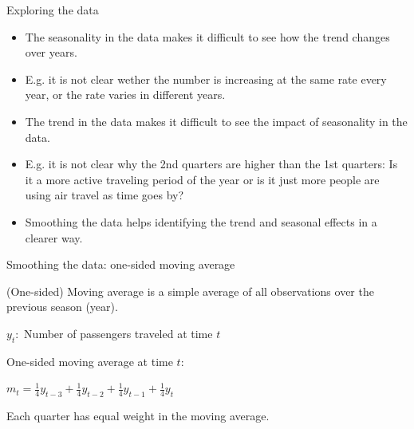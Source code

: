 \documentclass{beamer}\usepackage[]{graphicx}\usepackage[]{color}
\begin{document}
\begin{darkframes}
\begin{frame}[fragile]{Exploring the data}
\begin{itemize}[<+->]
        \item The seasonality in the data makes it difficult to see how the trend changes over years.
        
        \item E.g. it is not clear wether the number is increasing at the same rate every year, or the rate varies in different years. 
        
        \item The trend in the data makes it difficult to see the impact of seasonality in the data. 
        
        \item E.g. it is not clear why the 2nd quarters are higher than the 1st quarters: Is it a more active traveling period of the year or is it just more people are using air travel as time goes by?
        
        \item Smoothing the data helps identifying the trend and seasonal effects in a clearer way.
      \end{itemize}
    \end{frame}
    
    
    
    \begin{frame}[fragile]{Smoothing the data: one-sided moving average}
    \fontsize{9}{9}\selectfont
        
        \alert{(One-sided) Moving average} is a simple average of all observations over the previous season (year).
        
        \begin{center}
          $y_t:$ Number of passengers traveled at time $t$
        \end{center}  
        
        One-sided moving average at time $t$:
        
        \begin{center}
          $m_t = \frac{1}{4} y_{t-3} + \frac{1}{4} y_{t-2} + \frac{1}{4} y_{t-1} + \frac{1}{4} y_{t}$
        \end{center}  
        Each quarter has equal weight in the moving average.
        
    \end{frame}
    
    
    

\end{darkframes}
\end{document}
